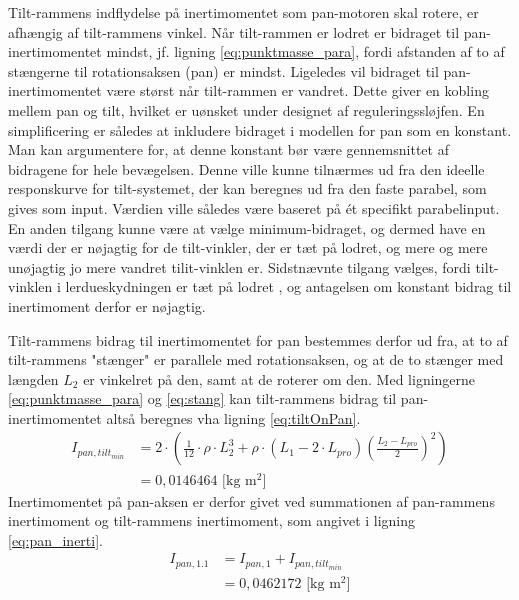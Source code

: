 Tilt-rammens indflydelse på inertimomentet som pan-motoren skal rotere, er afhængig af tilt-rammens vinkel.
Når tilt-rammen er lodret er bidraget til pan-inertimomentet mindst, jf. ligning \ref{eq:punktmasse_para}, fordi afstanden
af to af stængerne til rotationsaksen (pan) er mindst. Ligeledes vil bidraget til pan-inertimomentet være størst når tilt-rammen er vandret.
Dette giver en kobling mellem pan og tilt, hvilket er uønsket under designet af reguleringssløjfen. En simplificering er således at inkludere bidraget i modellen for pan som en konstant.
Man kan argumentere for, at denne konstant bør være gennemsnittet af bidragene for hele bevægelsen.
Denne ville kunne tilnærmes ud fra den ideelle responskurve for tilt-systemet, der kan beregnes ud fra den faste parabel, som gives som input.
Værdien ville således være baseret på ét specifikt parabelinput. En anden tilgang kunne være at vælge minimum-bidraget, og dermed
have en værdi der er nøjagtig for de tilt-vinkler, der er tæt på lodret, og mere og mere unøjagtig jo mere vandret tilit-vinklen er.
Sidstnævnte tilgang vælges, fordi tilt-vinklen i lerdueskydningen er tæt på lodret
,
og antagelsen om konstant bidrag til inertimoment derfor er nøjagtig.

Tilt-rammens bidrag til inertimomentet for pan bestemmes derfor ud fra, at to af tilt-rammens "stænger" er parallele med
rotationsaksen, og at de to stænger med længden \({L_{2}}\) er vinkelret på den, samt at de roterer om den.
Med ligningerne \ref{eq:punktmasse_para} og \ref{eq:stang}
kan tilt-rammens bidrag til pan-inertimomentet altså beregnes vha ligning \ref{eq:tiltOnPan}.
\begin{align}
I_{pan,tilt_{min}}&=2\cdot{}\left(\frac{1}{12}\cdot{}\rho\cdot{}L_{2}^3
+\rho\cdot{}\left(L_1-2\cdot{}L_{pro}\right)\left(\frac{L_2-L_{pro}}{2}\right)^2\right)
\\
&=0,0146464 \text{ [kg m$^2$]}
\label{eq:tiltOnPan} 
\end{align}
Inertimomentet på pan-aksen er derfor givet ved summationen af pan-rammens inertimoment og tilt-rammens inertimoment,
som angivet i ligning \ref{eq:pan_inerti}.
\begin{align}
{ I }_{ pan,1.1 } &= I_{ pan,1 }+I_ { pan,tilt_{ min} }
\\&=0,0462172 \text{ [kg m$^2$]}
\label{eq:pan_inerti} 
\end{align}

